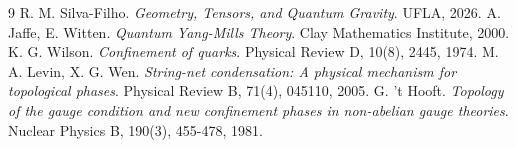 \documentclass[11pt,a4paper]{amsart}
\theoremstyle{definition}
\begin{document}
\begin{thebibliography}{9}
R. M. Silva-Filho. \emph{Geometry, Tensors, and Quantum Gravity}. UFLA, 2026.
A. Jaffe, E. Witten. \emph{Quantum Yang-Mills Theory}. Clay Mathematics Institute, 2000.
K. G. Wilson. \emph{Confinement of quarks}. Physical Review D, 10(8), 2445, 1974.
M. A. Levin, X. G. Wen. \emph{String-net condensation: A physical mechanism for topological phases}. Physical Review B, 71(4), 045110, 2005.
G. 't Hooft. \emph{Topology of the gauge condition and new confinement phases in non-abelian gauge theories}. Nuclear Physics B, 190(3), 455-478, 1981.
\end{thebibliography}
\end{document}
